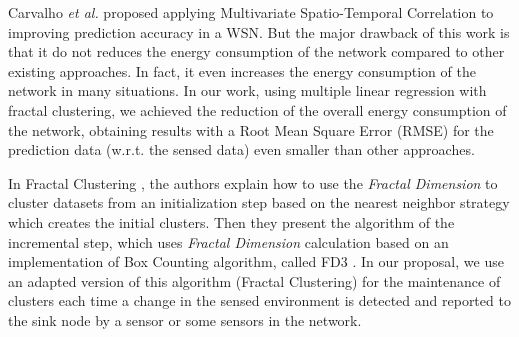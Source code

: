 \documentclass{acm_proc_article-sp}
\begin{document}

Carvalho \textit{et al.} \cite{Carvalho2011} proposed applying Multivariate
Spatio-Temporal Correlation to improving prediction accuracy in a WSN. But the
major drawback of this work is that it do not reduces the energy consumption of
the network compared to other existing approaches. In fact, it even increases
the energy consumption of the network in many situations. In our work, using
multiple linear regression with fractal clustering, we achieved the reduction of
the overall energy consumption of the network, obtaining results with a Root
Mean Square Error (RMSE) for the prediction data (w.r.t. the sensed data) even
smaller than other approaches.

In Fractal Clustering \cite{Barbara2000}, the authors explain how to use the
\textit{Fractal Dimension} to cluster datasets from an initialization step
based on the nearest neighbor strategy which creates the initial clusters. Then
they present the algorithm of the incremental step, which uses \textit{Fractal
Dimension} calculation based on an implementation of Box Counting algorithm,
called FD3 \cite{Liebovitch1989}. In our proposal, we use an adapted version of
this algorithm (Fractal Clustering) for the maintenance of clusters each time a
change in the sensed environment is detected and reported to the sink node by
a sensor or some sensors in the network.
\end{document}

